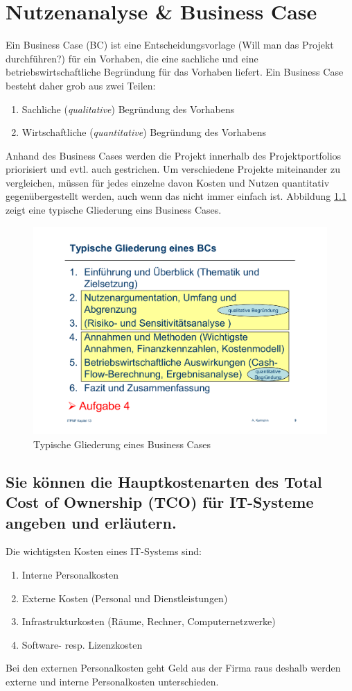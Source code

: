 \chapter{Nutzenanalyse \& Business Case}

Ein Business Case (BC) ist eine Entscheidungsvorlage (Will man das Projekt durchführen?) für ein Vorhaben, die eine sachliche und eine betriebswirtschaftliche Begründung für das Vorhaben liefert. Ein Business Case besteht daher grob aus zwei Teilen:
\begin{enumerate}
	\item Sachliche (\emph{qualitative}) Begründung des Vorhabens
	\item Wirtschaftliche (\emph{quantitative}) Begründung des Vorhabens
\end{enumerate}
Anhand des Business Cases werden die Projekt innerhalb des Projektportfolios priorisiert und evtl. auch gestrichen. Um verschiedene Projekte miteinander zu vergleichen, müssen für jedes einzelne davon Kosten und Nutzen quantitativ gegenübergestellt werden, auch wenn das nicht immer einfach ist. Abbildung \ref{fig:gliederung-business-case} zeigt eine typische Gliederung eins Business Cases.

\begin{figure}
\centering
\includegraphics[width=0.7\linewidth]{fig/gliederung-business-case}
\caption{Typische Gliederung eines Business Cases}
\label{fig:gliederung-business-case}
\end{figure}


\section{Sie können die Hauptkostenarten des Total Cost of Ownership (TCO) für IT-Systeme angeben und erläutern.}

Die wichtigsten Kosten eines IT-Systems sind:
\begin{enumerate}
	\item Interne Personalkosten
	\item Externe Kosten (Personal und Dienstleistungen)
	\item Infrastrukturkosten (Räume, Rechner, Computernetzwerke)
	\item Software- resp. Lizenzkosten
\end{enumerate}
Bei den externen Personalkosten geht Geld aus der Firma raus deshalb werden externe und interne Personalkosten unterschieden.

